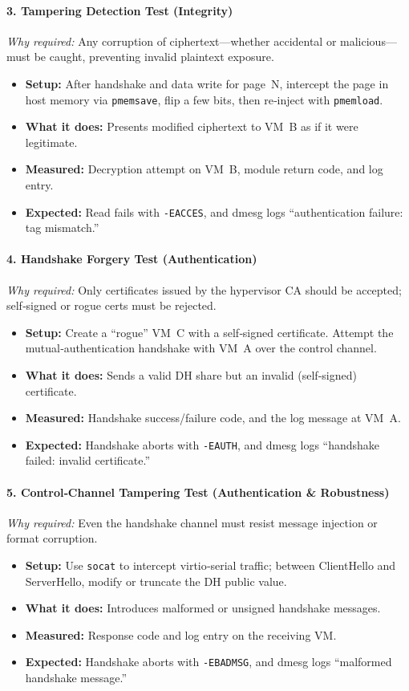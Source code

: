 \documentclass[conference]{IEEEtran}
\begin{document}
\paragraph{3. Tampering Detection Test (Integrity)}  
\emph{Why required:} Any corruption of ciphertext—whether accidental or malicious—must be caught, preventing invalid plaintext exposure.  
\begin{itemize}
  \item \textbf{Setup:} After handshake and data write for page~N, intercept the page in host memory via \texttt{pmemsave}, flip a few bits, then re‐inject with \texttt{pmemload}.
  \item \textbf{What it does:} Presents modified ciphertext to VM~B as if it were legitimate.
  \item \textbf{Measured:} Decryption attempt on VM~B, module return code, and log entry.
  \item \textbf{Expected:} Read fails with \texttt{-EACCES}, and dmesg logs “authentication failure: tag mismatch.”
\end{itemize}

\paragraph{4. Handshake Forgery Test (Authentication)}  
\emph{Why required:} Only certificates issued by the hypervisor CA should be accepted; self‐signed or rogue certs must be rejected.  
\begin{itemize}
  \item \textbf{Setup:} Create a “rogue” VM~C with a self‐signed certificate. Attempt the mutual‐authentication handshake with VM~A over the control channel.
  \item \textbf{What it does:} Sends a valid DH share but an invalid (self‐signed) certificate.
  \item \textbf{Measured:} Handshake success/failure code, and the log message at VM~A.
  \item \textbf{Expected:} Handshake aborts with \texttt{-EAUTH}, and dmesg logs “handshake failed: invalid certificate.”
\end{itemize}

\paragraph{5. Control‐Channel Tampering Test (Authentication \& Robustness)}  
\emph{Why required:} Even the handshake channel must resist message injection or format corruption.  
\begin{itemize}
  \item \textbf{Setup:} Use \texttt{socat} to intercept virtio‐serial traffic; between ClientHello and ServerHello, modify or truncate the DH public value.
  \item \textbf{What it does:} Introduces malformed or unsigned handshake messages.
  \item \textbf{Measured:} Response code and log entry on the receiving VM.
  \item \textbf{Expected:} Handshake aborts with \texttt{-EBADMSG}, and dmesg logs “malformed handshake message.”
\end{itemize}
\end{document}
